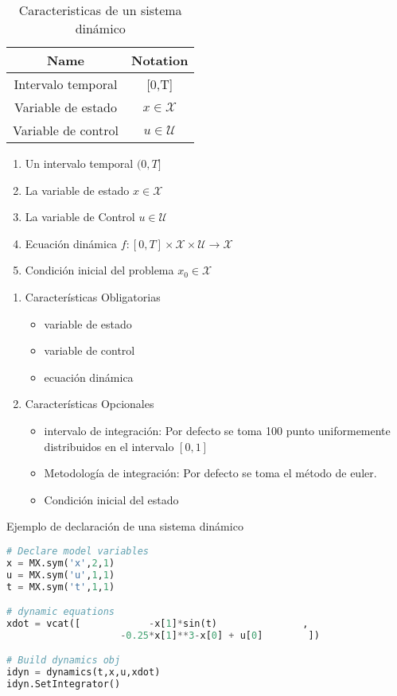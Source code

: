 \documentclass[]{article}
\begin{document}
\begin{table}[ht!]
    \centering
    \begin{tabular}{|c|c|}
        \hline 
        Name & Notation \\
        \hline \hline
        Intervalo temporal & [0,T] \\
        \hline
        Variable de estado & $x \in \mathcal{X}$ \\
        \hline 
        Variable de control & $u \in \mathcal{U}$ \\
        \hline
    \end{tabular}
    \caption{Caracteristicas de un sistema dinámico}
\end{table}
\begin{enumerate}
    \item Un intervalo temporal $(0,T]$
    \item La variable de estado $x \in \mathcal{X}$
    \item La variable de Control $u \in \mathcal{U}$
    \item Ecuación dinámica $f: [0,T] \times \mathcal{X} \times \mathcal{U} \rightarrow \mathcal{X}$
    
    \item Condición inicial del problema $x_0 \in \mathcal{X}$
\end{enumerate}

\begin{enumerate}
    \item Características Obligatorias 
    \begin{itemize}
        \item variable de estado
        \item variable de control
        \item ecuación dinámica
    \end{itemize}
    \item Características Opcionales 
    \begin{itemize}
        \item intervalo de integración: Por defecto se toma 100 punto uniformemente distribuidos en el intervalo $[0,1]$
        \item Metodología de integración: Por defecto se toma el método de euler.
        \item Condición inicial del estado
    \end{itemize}
\end{enumerate}
\begin{algorithm}[ht!]
	\caption{Ejemplo de declaración de una sistema dinámico} \label{alg:coefficients_p2}
    \begin{lstlisting}[language=Python]
# Declare model variables
x = MX.sym('x',2,1)
u = MX.sym('u',1,1)
t = MX.sym('t',1,1)

# dynamic equations
xdot = vcat([            -x[1]*sin(t)               , 
                    -0.25*x[1]**3-x[0] + u[0]        ])

# Build dynamics obj
idyn = dynamics(t,x,u,xdot)
idyn.SetIntegrator()
\end{lstlisting}
\end{algorithm} 
\end{document}
